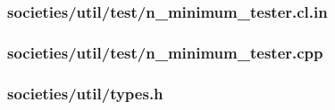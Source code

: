 \documentclass{article}
\begin{document}
\subsubsection*{societies/util/test/n\_minimum\_tester.cl.in}


\subsubsection*{societies/util/test/n\_minimum\_tester.cpp}


\subsubsection*{societies/util/types.h}

\fi
\end{document}

